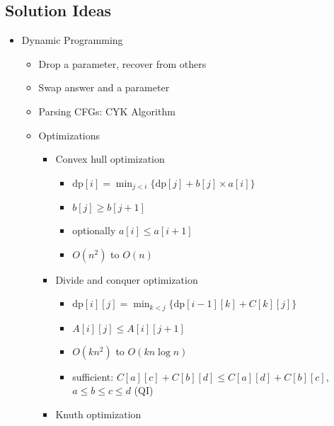 \documentclass[9pt,a4paper,twocolumn,landscape,oneside]{amsart}
\begin{document}
        \subsection{Solution Ideas}
            \begin{itemize}
                \item Dynamic Programming
                    \begin{itemize}
                        \item Drop a parameter, recover from others
                        \item Swap answer and a parameter
                        \item Parsing CFGs: CYK Algorithm
                        \item Optimizations
                            \begin{itemize}
                                \item Convex hull optimization
                                    \begin{itemize}
                                        \item $\mathrm{dp}[i] = \min_{j<i}\{\mathrm{dp}[j] + b[j] \times a[i]\}$
                                        \item $b[j] \geq b[j+1]$
                                        \item optionally $a[i] \leq a[i+1]$
                                        \item $O(n^2)$ to $O(n)$
                                    \end{itemize}
                                \item Divide and conquer optimization
                                    \begin{itemize}
                                        \item $\mathrm{dp}[i][j] = \min_{k<j}\{\mathrm{dp}[i-1][k] + C[k][j]\}$
                                        \item $A[i][j] \leq A[i][j+1]$
                                        \item $O(kn^2)$ to $O(kn\log{n})$
                                        \item sufficient: $C[a][c] + C[b][d] \leq C[a][d] + C[b][c]$, $a\leq b\leq c\leq d$ (QI)
                                    \end{itemize}
                                \item Knuth optimization
                                    \begin{itemize}

\end{itemize}
\end{itemize}
\end{itemize}
\end{itemize}
\end{document}
